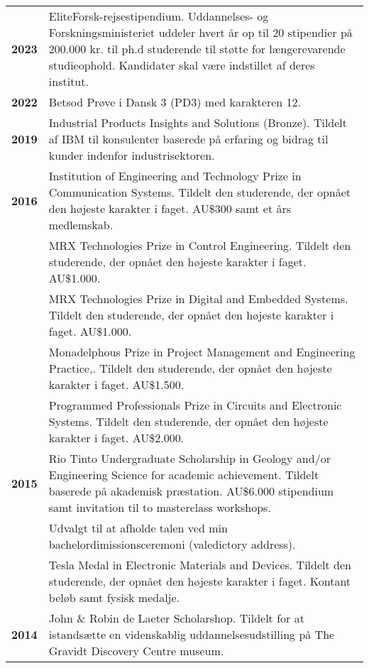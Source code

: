 \documentclass[a4paper,11pt]{article}
\begin{document}
\noindent
\begin{tabular}{lp{}}
    \textbf{2023} & EliteForsk-rejsestipendium. \textcolor{subduedcolour}{Uddannelses- og Forskningsministeriet uddeler hvert år op til 20 stipendier på 200.000 kr. til ph.d studerende til støtte for længerevarende studieophold. Kandidater skal være indstillet af deres institut.} \\

    \textbf{2022} & Betsod Prøve i Dansk 3 (PD3) med karakteren 12. \\

    \textbf{2019} & Industrial Products Insights and Solutions (Bronze). \textcolor{subduedcolour}{Tildelt af IBM til konsulenter baserede på erfaring og bidrag til kunder indenfor industrisektoren.} \\

    \textbf{2016} & Institution of Engineering and Technology Prize in Communication Systems. \textcolor{subduedcolour}{Tildelt den studerende, der opnået den højeste karakter i faget. AU\$300 samt et års medlemskab.} \\

    & MRX Technologies Prize in Control Engineering. \textcolor{subduedcolour}{Tildelt den studerende, der opnået den højeste karakter i faget. AU\$1.000.} \\

    & MRX Technologies Prize in Digital and Embedded Systems. \textcolor{subduedcolour}{Tildelt den studerende, der opnået den højeste karakter i faget. AU\$1.000.} \\

    & Monadelphous Prize in Project Management and Engineering Practice,. \textcolor{subduedcolour}{Tildelt den studerende, der opnået den højeste karakter i faget. AU\$1.500.} \\

    & Programmed Professionals Prize in Circuits and Electronic Systems. \textcolor{subduedcolour}{Tildelt den studerende, der opnået den højeste karakter i faget. AU\$2.000.} \\

    \textbf{2015} & Rio Tinto Undergraduate Scholarship in Geology and/or Engineering Science for academic achievement. \textcolor{subduedcolour}{Tildelt baserede på akademisk præstation. AU\$6.000 stipendium samt invitation til to masterclass workshops.} \\

    & Udvalgt til at afholde talen ved min bachelordimissionsceremoni \textcolor{subduedcolour}{(valedictory address).} \\

    & Tesla Medal in Electronic Materials and Devices. \textcolor{subduedcolour}{Tildelt den studerende, der opnået den højeste karakter i faget. %
    Kontant beløb samt fysisk medalje.} \\

    \textbf{2014} & John \& Robin de Laeter Scholarshop. \textcolor{subduedcolour}{Tildelt for at istandsætte en videnskablig uddannelsesudstilling på The Gravidt Discovery Centre museum.}
\end{tabular}
\end{document}
